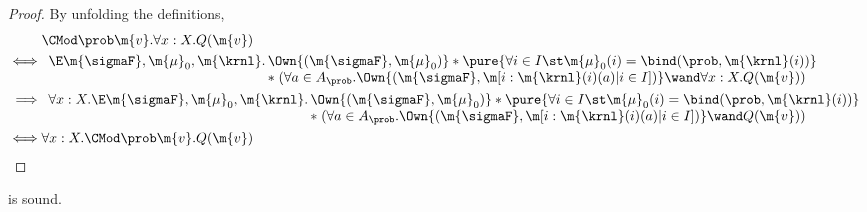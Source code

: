 \documentclass[acmsmall,nonacm,screen,appendix]{acmart}
\begin{document}
\begin{proof}
  By unfolding the definitions,
\begin{align*}
      &\CMod\prob \m{v}. \forall x: X. Q(\m{v}) \\
    \iff &
    \begin{array}[t]{r@{\,}l}
    \E \m{\sigmaF}, \m{\mu}_0, \m{\krnl}.
      &\Own{(\m{\sigmaF}, \m{\mu}_0)} *
      \pure{
        \forall i\in I\st
          \m{\mu}_0(i) = \bind(\prob, \m{\krnl}(i))
      }\\ & * \; (
        \forall a \in A_{\prob}.
\Own{(\m{\sigmaF}, \m[i: \m{\krnl}(i)(a) | i \in I])} \wand \forall x: X. Q(\m{v})
          )
    \end{array}
    \\
    \implies &
    \begin{array}[t]{r@{\,}l}
    \forall x: X.
    \E \m{\sigmaF}, \m{\mu}_0, \m{\krnl}.
      &\Own{(\m{\sigmaF}, \m{\mu}_0)} *
      \pure{
        \forall i\in I\st
          \m{\mu}_0(i) = \bind(\prob, \m{\krnl}(i))
      }\\ & * \; (
        \forall a \in A_{\prob}.
\Own{(\m{\sigmaF}, \m[i: \m{\krnl}(i)(a) | i \in I])} \wand Q(\m{v})
          )
    \end{array}\\
    \iff & \forall x: X. \CMod\prob \m{v}. Q(\m{v})
  \end{align*}
\end{proof} \begin{lemma}
\label{proof:c-pure}
   is sound.
\end{lemma}
\end{document}
